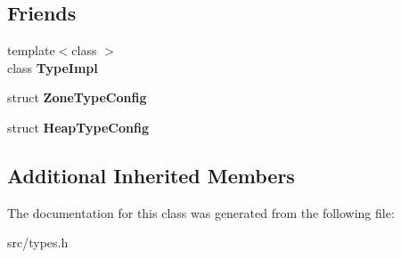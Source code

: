 \subsection*{Friends}
\begin{DoxyCompactItemize}
\item 
\hypertarget{classv8_1_1internal_1_1_type_impl_1_1_structural_type_a4329ebeb28d34f95516ba1e6939c015b}{}{\footnotesize template$<$class $>$ }\\class {\bfseries Type\+Impl}\label{classv8_1_1internal_1_1_type_impl_1_1_structural_type_a4329ebeb28d34f95516ba1e6939c015b}

\item 
\hypertarget{classv8_1_1internal_1_1_type_impl_1_1_structural_type_abd8d8e02af7d4e33fc7650aef37d18ae}{}struct {\bfseries Zone\+Type\+Config}\label{classv8_1_1internal_1_1_type_impl_1_1_structural_type_abd8d8e02af7d4e33fc7650aef37d18ae}

\item 
\hypertarget{classv8_1_1internal_1_1_type_impl_1_1_structural_type_ab5f5dc429d41d9dd53ec44007fbca151}{}struct {\bfseries Heap\+Type\+Config}\label{classv8_1_1internal_1_1_type_impl_1_1_structural_type_ab5f5dc429d41d9dd53ec44007fbca151}

\end{DoxyCompactItemize}
\subsection*{Additional Inherited Members}


The documentation for this class was generated from the following file\+:\begin{DoxyCompactItemize}
\item 
src/types.\+h\end{DoxyCompactItemize}
